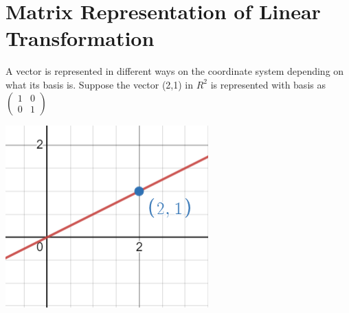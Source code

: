\documentclass[a4paper,12pt,reqno,oneside]{amsart}
\theoremstyle{plain}
\numberwithin{equation}{section}
\begin{document}
\section{Matrix Representation of Linear Transformation}
A vector is represented in different ways on the coordinate system depending on what its basis is. Suppose the vector (2,1) in $R^2$ is represented with basis as 
$\begin{pmatrix}
    1 & 0\\
    0 & 1
\end{pmatrix}$


 \begin{center}
     \includegraphics{"figure1.png"}
 \end{center}
 
\end{document}
